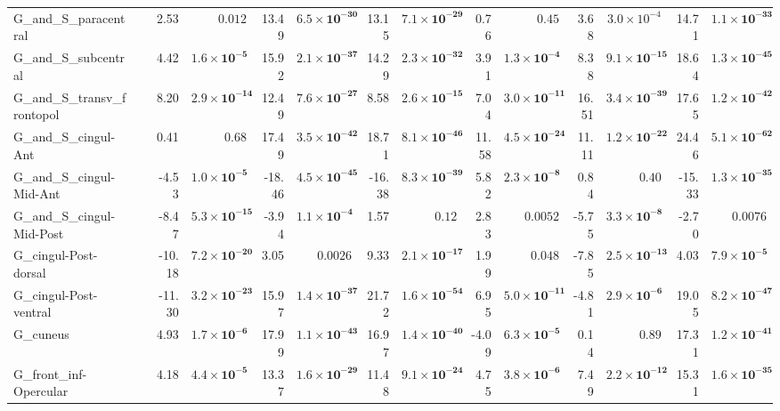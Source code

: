{\begin{longtable}{llrrrrrrrrrrrr}
G\_and\_S\_paracentral &  & 2.53 & $0.012$ & 13.49 & $\mathbf{6.5{\times}10^{-30}}$ & 13.15 & $\mathbf{7.1{\times}10^{-29}}$ & 0.76 & $0.45$ & 3.68 & $3.0{\times}10^{-4}$ & 14.71 & $\mathbf{1.1{\times}10^{-33}}$ \\
G\_and\_S\_subcentral &  & 4.42 & $\mathbf{1.6{\times}10^{-5}}$ & 15.92 & $\mathbf{2.1{\times}10^{-37}}$ & 14.29 & $\mathbf{2.3{\times}10^{-32}}$ & 3.91 & $\mathbf{1.3{\times}10^{-4}}$ & 8.38 & $\mathbf{9.1{\times}10^{-15}}$ & 18.64 & $\mathbf{1.3{\times}10^{-45}}$ \\
G\_and\_S\_transv\_frontopol &  & 8.20 & $\mathbf{2.9{\times}10^{-14}}$ & 12.49 & $\mathbf{7.6{\times}10^{-27}}$ & 8.58 & $\mathbf{2.6{\times}10^{-15}}$ & 7.04 & $\mathbf{3.0{\times}10^{-11}}$ & 16.51 & $\mathbf{3.4{\times}10^{-39}}$ & 17.65 & $\mathbf{1.2{\times}10^{-42}}$ \\
G\_and\_S\_cingul-Ant &  & 0.41 & $0.68$ & 17.49 & $\mathbf{3.5{\times}10^{-42}}$ & 18.71 & $\mathbf{8.1{\times}10^{-46}}$ & 11.58 & $\mathbf{4.5{\times}10^{-24}}$ & 11.11 & $\mathbf{1.2{\times}10^{-22}}$ & 24.46 & $\mathbf{5.1{\times}10^{-62}}$ \\
G\_and\_S\_cingul-Mid-Ant &  & -4.53 & $\mathbf{1.0{\times}10^{-5}}$ & -18.46 & $\mathbf{4.5{\times}10^{-45}}$ & -16.38 & $\mathbf{8.3{\times}10^{-39}}$ & 5.82 & $\mathbf{2.3{\times}10^{-8}}$ & 0.84 & $0.40$ & -15.33 & $\mathbf{1.3{\times}10^{-35}}$ \\
G\_and\_S\_cingul-Mid-Post &  & -8.47 & $\mathbf{5.3{\times}10^{-15}}$ & -3.94 & $\mathbf{1.1{\times}10^{-4}}$ & 1.57 & $0.12$ & 2.83 & $0.0052$ & -5.75 & $\mathbf{3.3{\times}10^{-8}}$ & -2.70 & $0.0076$ \\
G\_cingul-Post-dorsal &  & -10.18 & $\mathbf{7.2{\times}10^{-20}}$ & 3.05 & $0.0026$ & 9.33 & $\mathbf{2.1{\times}10^{-17}}$ & 1.99 & $0.048$ & -7.85 & $\mathbf{2.5{\times}10^{-13}}$ & 4.03 & $\mathbf{7.9{\times}10^{-5}}$ \\
G\_cingul-Post-ventral &  & -11.30 & $\mathbf{3.2{\times}10^{-23}}$ & 15.97 & $\mathbf{1.4{\times}10^{-37}}$ & 21.72 & $\mathbf{1.6{\times}10^{-54}}$ & 6.95 & $\mathbf{5.0{\times}10^{-11}}$ & -4.81 & $\mathbf{2.9{\times}10^{-6}}$ & 19.05 & $\mathbf{8.2{\times}10^{-47}}$ \\
G\_cuneus &  & 4.93 & $\mathbf{1.7{\times}10^{-6}}$ & 17.99 & $\mathbf{1.1{\times}10^{-43}}$ & 16.97 & $\mathbf{1.4{\times}10^{-40}}$ & -4.09 & $\mathbf{6.3{\times}10^{-5}}$ & 0.14 & $0.89$ & 17.31 & $\mathbf{1.2{\times}10^{-41}}$ \\
G\_front\_inf-Opercular &  & 4.18 & $\mathbf{4.4{\times}10^{-5}}$ & 13.37 & $\mathbf{1.6{\times}10^{-29}}$ & 11.48 & $\mathbf{9.1{\times}10^{-24}}$ & 4.75 & $\mathbf{3.8{\times}10^{-6}}$ & 7.49 & $\mathbf{2.2{\times}10^{-12}}$ & 15.31 & $\mathbf{1.6{\times}10^{-35}}$ \\

\end{longtable}}

